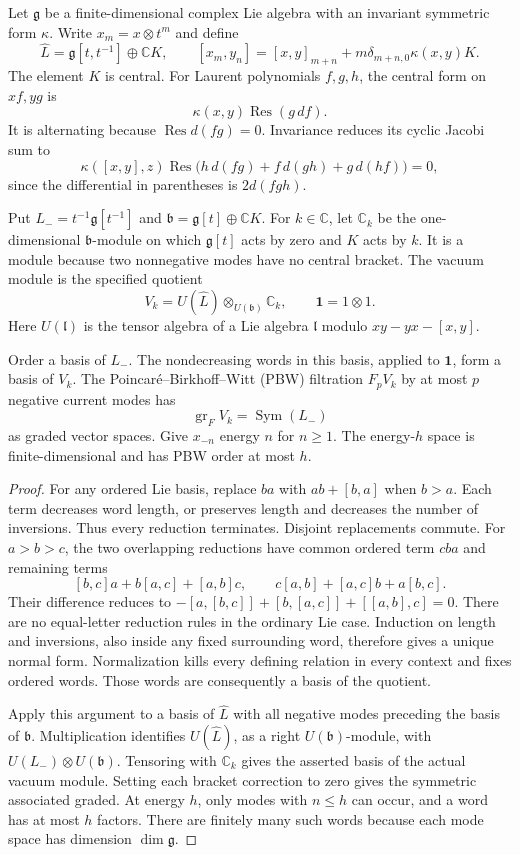 Let $\mathfrak g$ be a finite-dimensional complex Lie algebra with an invariant symmetric form $\kappa$.
Write $x_m=x\otimes t^m$ and define
\[
\widehat L=\mathfrak g[t,t^{-1}]\oplus\mathbb CK,
\qquad [x_m,y_n]=[x,y]_{m+n}+m\delta_{m+n,0}\kappa(x,y)K.
\]
The element $K$ is central.
For Laurent polynomials $f,g,h$, the central form on $xf,yg$ is
\[
\kappa(x,y)\operatorname{Res}(g\,df).
\]
It is alternating because $\operatorname{Res}d(fg)=0$.
Invariance reduces its cyclic Jacobi sum to
\[
\kappa([x,y],z)\operatorname{Res}
\bigl(h\,d(fg)+f\,d(gh)+g\,d(hf)\bigr)=0,
\]
since the differential in parentheses is $2d(fgh)$.

Put $L_-=t^{-1}\mathfrak g[t^{-1}]$ and
$\mathfrak b=\mathfrak g[t]\oplus\mathbb CK$.
For $k\in\mathbb C$, let $\mathbb C_k$ be the one-dimensional $\mathfrak b$-module on which $\mathfrak g[t]$ acts by zero and $K$ acts by $k$.
It is a module because two nonnegative modes have no central bracket.
The vacuum module is the specified quotient
\[
V_k=U(\widehat L)\otimes_{U(\mathfrak b)}\mathbb C_k,
\qquad \mathbf1=1\otimes1.
\]
Here $U(\mathfrak l)$ is the tensor algebra of a Lie algebra $\mathfrak l$ modulo $xy-yx-[x,y]$.

\begin{lemma}\label{lem:fl19-state-pbw}
Order a basis of $L_-$.
The nondecreasing words in this basis, applied to $\mathbf1$, form a basis of $V_k$.
The Poincar\'e--Birkhoff--Witt (PBW) filtration $F_pV_k$ by at most $p$ negative current modes has
\[
\operatorname{gr}_F V_k=\operatorname{Sym}(L_-)
\]
as graded vector spaces.
Give $x_{-n}$ energy $n$ for $n\ge1$.
The energy-$h$ space is finite-dimensional and has PBW order at most $h$.
\end{lemma}
\begin{proof}
For any ordered Lie basis, replace $ba$ with $ab+[b,a]$ when $b>a$.
Each term decreases word length, or preserves length and decreases the number of inversions.
Thus every reduction terminates.
Disjoint replacements commute.
For $a>b>c$, the two overlapping reductions have common ordered term $cba$ and remaining terms
\[
[b,c]a+b[a,c]+[a,b]c,
\qquad c[a,b]+[a,c]b+a[b,c].
\]
Their difference reduces to
$-[a,[b,c]]+[b,[a,c]]+[[a,b],c]=0$.
There are no equal-letter reduction rules in the ordinary Lie case.
Induction on length and inversions, also inside any fixed surrounding word, therefore gives a unique normal form.
Normalization kills every defining relation in every context and fixes ordered words.
Those words are consequently a basis of the quotient.

Apply this argument to a basis of $\widehat L$ with all negative modes preceding the basis of $\mathfrak b$.
Multiplication identifies $U(\widehat L)$, as a right $U(\mathfrak b)$-module, with
$U(L_-)\otimes U(\mathfrak b)$.
Tensoring with $\mathbb C_k$ gives the asserted basis of the actual vacuum module.
Setting each bracket correction to zero gives the symmetric associated graded.
At energy $h$, only modes with $n\le h$ can occur, and a word has at most $h$ factors.
There are finitely many such words because each mode space has dimension $\dim\mathfrak g$.
\end{proof}

